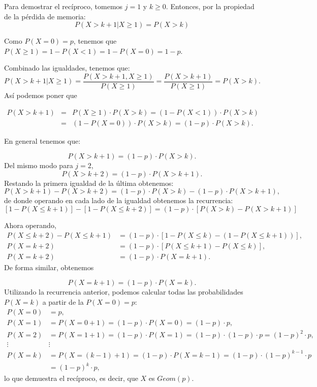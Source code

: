 \documentclass[
  letterpaper,
  DIV=11,
  numbers=noendperiod]{scrreprt}
\begin{document}
Para demostrar el recíproco, tomemos \(j=1\) y \(k\geq 0\). Entonces,
por la propiedad de la pérdida de memoria: \[
P\left(X> k+1\big| X\geq 1\right)=P(X> k)
\]

Como \(P(X=0)=p\), tenemos que \(P(X \geq 1 )=1-P(X<1)=1-P(X=0)=1-p\).

Combinado las igualdades, tenemos que: \[
P\left(X> k+1\big| X\geq 1\right)=\frac{P(X>k+1, X\geq 1)}{P(X\geq 1)}=\frac{P(X>k+1)}{P(X\geq 1)}=P(X>k).
\] Así podemos poner que

\[
\begin{array}{rll}
P(X>k+1)&=&P(X\geq 1)\cdot P(X>k)=\left(1-P(X<1)\right)\cdot P(X>k)\\
&=&\left(1-P(X=0)\right)\cdot P(X>k)=(1-p)\cdot P(X>k).
\end{array}
\]

En general tenemos que:

\[
P(X>k+1)=(1-p)\cdot P(X>k).
\] Del mismo modo para \(j=2\), \[
P(X>k+2)=(1-p)\cdot P(X>k+1).
\] Restando la primera igualdad de la última obtenemos: \[
P(X>k+1)-P(X>k+2)=(1-p)\cdot P(X>k)-(1-p)\cdot P(X>k+1),
\] de donde operando en cada lado de la igualdad obtenemos la
recurrencia: \[
[1-P(X\leq k+1)]-[1-P(X\leq k+2)]=(1-p)\cdot [P(X>k)-P(X>k+1)]
\]

Ahora operando, \[
\begin{array}{rl}
P(X\leq k+2)-P(X\leq k+1) & =(1-p)\cdot[1-P(X\leq k)-\left(1-P(X\leq k+1)\right)],\\
P(X=k+2) & =(1-p)\cdot[P(X\leq k+1)-P(X\leq k)], \\
P(X=k+2) & =(1-p)\cdot P(X=k+1).
\end{array}
\] De forma similar, obtenemos

\[
P(X=k+1)=(1-p)\cdot P(X=k).
\] Utilizando la recurrencia anterior, podemos calcular todas las
probabilidades \(P(X=k)\) a partir de la \(P(X=0)=p\): \[
\begin{array}{rl}
P(X=0)&= p,\\
P(X=1)&=P(X=0+1)= (1-p)\cdot P(X=0) =(1-p)\cdot  p,\\
P(X=2)&=P(X=1+1)= (1-p)\cdot P(X=1)=(1-p)\cdot (1-p)\cdot p=(1-p)^2\cdot p,\\
 \vdots& \vdots \\
P(X=k)&=P(X=(k-1)+1)= (1-p)\cdot P(X=k-1)=(1-p)\cdot (1-p)^{k-1}\cdot p \\
& =(1-p)^{k}\cdot p,
\end{array}
\] lo que demuestra el recíproco, es decir, que \(X\) es \(Geom(p)\).
\end{document}
